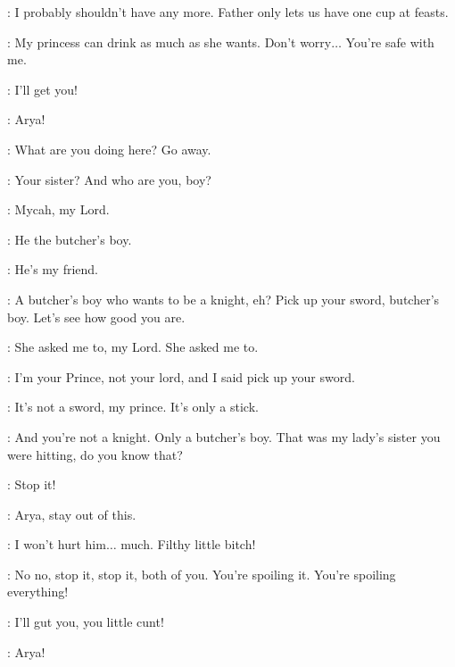 
\SANSA: I probably shouldn't have any more. Father only lets us have one cup at feasts. 

\JOFFREY: My princess can drink as much as she wants. Don't worry$\ldots$ You're safe with me. 


\MYCAH: I'll get you! 

\SANSA: Arya! 

\ARYA: What are you doing here? Go away. 

\JOFFREY: Your sister? And who are you, boy? 

\MYCAH: Mycah, my Lord. 

\SANSA: He the butcher's boy. 

\ARYA: He's my friend. 

\JOFFREY: A butcher's boy who wants to be a knight, eh? Pick up your sword, butcher's boy. Let's see how good you are. 


\MYCAH: She asked me to, my Lord. She asked me to. 

\JOFFREY: I'm your Prince, not your lord, and I said pick up your sword. 

\MYCAH: It's not a sword, my prince. It's only a stick. 

\JOFFREY: And you're not a knight. Only a butcher's boy. That was my lady's sister you were hitting, do you know that? 

\ARYA: Stop it! 

\SANSA: Arya, stay out of this. 

\JOFFREY: I won't hurt him$\ldots$ much.  Filthy little bitch! 

\SANSA: No no, stop it, stop it, both of you. You're spoiling it. You're spoiling everything! 


\JOFFREY: I'll gut you, you little cunt! 

\SANSA: Arya!


